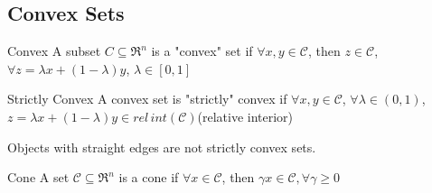 \subsection{Convex Sets}

\begin{definition}{Convex}
	A subset $C\subseteq \Re^n$ is a "convex" set if $\forall x,y \in \mathcal{C}$, then $z\in \mathcal{C}$, $\forall z = \lambda x + (1-\lambda)y$, $\lambda \in [0,1]$
\end{definition}


\begin{definition}{Strictly Convex}
	A convex set is "strictly" convex if $\forall x,y \in \mathcal{C}$, $\forall \lambda \in (0,1)$, $z = \lambda x + (1-\lambda)y \in rel\,int(\mathcal{C})$(relative interior)
\end{definition}

Objects with straight edges are not strictly convex sets.

\begin{definition}{Cone}
	A set $\mathcal{C}\subseteq \Re^n $ is a cone if $\forall x\in \mathcal{C}$, then $\gamma x\in \mathcal{C}, \forall \gamma \geq 0$
\end{definition}

